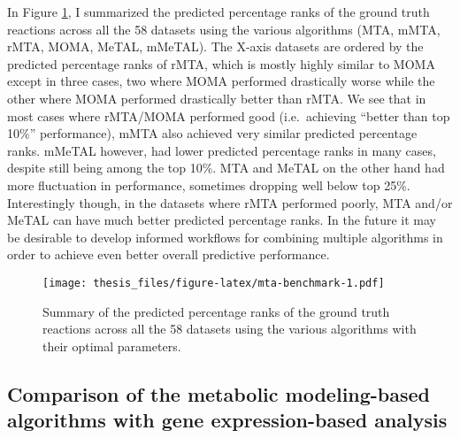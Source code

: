 \documentclass[12pt,twoside,openany,\mydriver]{thesis}  %
\begin{document}
In Figure \ref{fig:mta-benchmark}, I summarized the predicted percentage ranks of the ground truth reactions across all the 58 datasets using the various algorithms (MTA, mMTA, rMTA, MOMA, MeTAL, mMeTAL). The X-axis datasets are ordered by the predicted percentage ranks of rMTA, which is mostly highly similar to MOMA except in three cases, two where MOMA performed drastically worse while the other where MOMA performed drastically better than rMTA. We see that in most cases where rMTA/MOMA performed good (i.e.~achieving ``better than top 10\%'' performance), mMTA also achieved very similar predicted percentage ranks. mMeTAL however, had lower predicted percentage ranks in many cases, despite still being among the top 10\%. MTA and MeTAL on the other hand had more fluctuation in performance, sometimes dropping well below top 25\%. Interestingly though, in the datasets where rMTA performed poorly, MTA and/or MeTAL can have much better predicted percentage ranks. In the future it may be desirable to develop informed workflows for combining multiple algorithms in order to achieve even better overall predictive performance.
\begin{figure}
\centering
\texttt{[image: thesis\_files/figure-latex/mta-benchmark-1.pdf]}
\caption{\label{fig:mta-benchmark}Summary of the predicted percentage ranks of the ground truth reactions across all the 58 datasets using the various algorithms with their optimal parameters.}
\end{figure}
\hypertarget{comparison-of-the-metabolic-modeling-based-algorithms-with-gene-expression-based-analysis}{%
\subsection{Comparison of the metabolic modeling-based algorithms with gene expression-based analysis}\label{comparison-of-the-metabolic-modeling-based-algorithms-with-gene-expression-based-analysis}}
\end{document}
